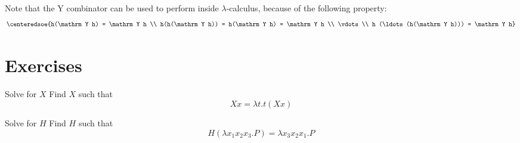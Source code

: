 \documentclass[a4paper, 12pt]{report}
\begin{document}
    Note that the $\mathrm Y$ combinator can be used to perform  inside $\lambda$-calculus, because of the following property: $$\centeredsoe{h(\mathrm Y h) = \mathrm Y h \\ h(h(\mathrm Y h)) = h(\mathrm Y h) = \mathrm Y h \\ \vdots \\ h (\ldots (h(\mathrm Y h))) = \mathrm Y h}$$ 


    \section{Exercises}

    \begin{framedprob}{Solve for $X$}
        Find $X$ such that $$Xx = \lambda t.t (Xx)$$
    \end{framedprob}
    
    
    \begin{framedprob}{Solve for $H$}
        Find $H$ such that $$H (\lambda x_1 x_2 x_3.P) = \lambda x_3 x_2 x_1 . P$$
    \end{framedprob}

\end{document}
